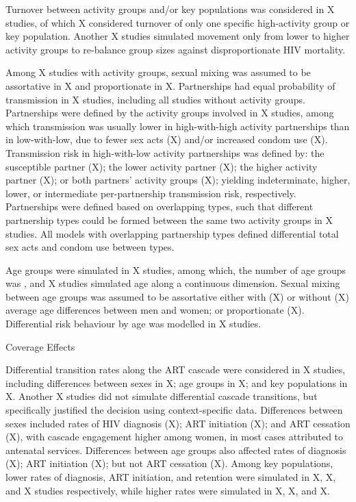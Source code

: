 Turnover between activity groups and/or key populations
was considered in X studies,
of which X considered turnover of only
one specific high-activity group or key population.
Another X studies simulated
movement only from lower to higher activity groups
to re-balance group sizes against disproportionate HIV mortality.

Among X studies with activity groups, sexual mixing was assumed to be
assortative in X and proportionate in X.
Partnerships had equal probability of transmission in X studies,
including all studies without activity groups.
Partnerships were defined by the activity groups involved in X studies,
among which transmission was usually
lower in high-with-high activity partnerships than in low-with-low, due to
fewer sex acts (X) and/or increased condom use (X).
Transmission risk in high-with-low activity partnerships was defined by:
the susceptible partner (X);
the lower activity partner (X);
the higher activity partner (X); or
both partners' activity groups (X);
yielding indeterminate, higher, lower, or intermediate
per-partnership transmission risk, respectively.
Partnerships were defined based on overlapping types, such that
different partnership types could be formed between the same two activity groups in X studies.
All models with overlapping partnership types defined differential total sex acts and condom use between types.

Age groups were simulated in X studies, among which,
the number of age groups was ,
and X studies simulated age along a continuous dimension.
Sexual mixing between age groups was assumed to be assortative
either with (X) or without (X)
average age differences between men and women;
or proportionate (X).
Differential risk behaviour by age was modelled in X studies.

Coverage Effects

Differential transition rates along the ART cascade were considered in
X studies, including differences between
sexes in X;
age groups in X; and
key populations in X.
Another X studies did not simulate differential cascade transitions,
but specifically justified the decision using context-specific data.
Differences between sexes included rates of
HIV diagnosis (X);
ART initiation (X); and
ART cessation (X),
with cascade engagement higher among women,
in most cases attributed to antenatal services.
Differences between age groups also affected
rates of diagnosis (X);
ART initiation (X);
but not ART cessation (X). 
Among key populations, lower rates of
diagnosis, ART initiation, and retention were simulated in
X, X, and X
studies respectively, while higher rates were simulated in
X, X, and X.

